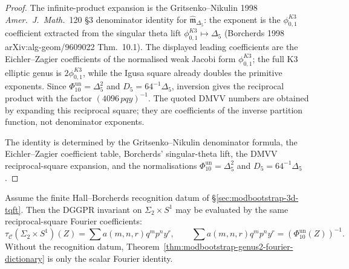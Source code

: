 \begin{proof}
The infinite-product expansion is the Gritsenko--Nikulin 1998
\emph{Amer.~J.~Math.}~120 \S 3 denominator identity for
$\widehat{\mathfrak m}_{\Delta_5}$: the exponent is the
\(\phi_{0,1}^{K3}\) coefficient extracted from the singular theta lift
\(\phi_{0,1}^{K3}\mapsto\Delta_5\) (Borcherds 1998
arXiv:alg-geom/9609022 Thm.~10.1). The displayed leading coefficients
are the Eichler--Zagier coefficients of the normalised weak Jacobi form
\(\phi_{0,1}^{K3}\); the full K3 elliptic genus is
\(2\phi_{0,1}^{K3}\), while the Igusa square already doubles the
primitive exponents.  Since
$\Phi_{10}^{\mathrm{un}}=\Delta_5^2$ and
$D_5=64^{-1}\Delta_5$, inversion gives the reciprocal product with the
factor $(4096\,p q y)^{-1}$.  The quoted DMVV numbers are obtained by
expanding this reciprocal square; they are coefficients of the inverse
partition function, not denominator exponents.

The identity is determined by the Gritsenko--Nikulin denominator
formula, the Eichler--Zagier coefficient table, Borcherds'
singular-theta lift, the DMVV reciprocal-square expansion, and the
normalisations \(\Phi_{10}^{\mathrm{un}}=\Delta_5^2\) and
\(D_5=64^{-1}\Delta_5\).
\end{proof}

\begin{remark}
\label{rem:modbootstrap-genus2-fourier-dictionary-tqft}
Assume the finite Hall--Borcherds recognition datum of
\S\ref{sec:modbootstrap-3d-tqft}.  Then the DGGPR invariant on
$\Sigma_2\times S^1$ may be evaluated by the same reciprocal-square
Fourier coefficients:
\[
 \tau_{\mathcal C}(\Sigma_2\!\times\! S^1)(Z)
 =
 \sum a(m,n,r)q^m p^n y^r,\qquad
 \sum a(m,n,r)q^m p^n y^r=(\Phi_{10}^{\mathrm{un}}(Z))^{-1}.
\]
Without the recognition datum, Theorem~\ref{thm:modbootstrap-genus2-fourier-dictionary}
is only the scalar Fourier identity.
\end{remark}

